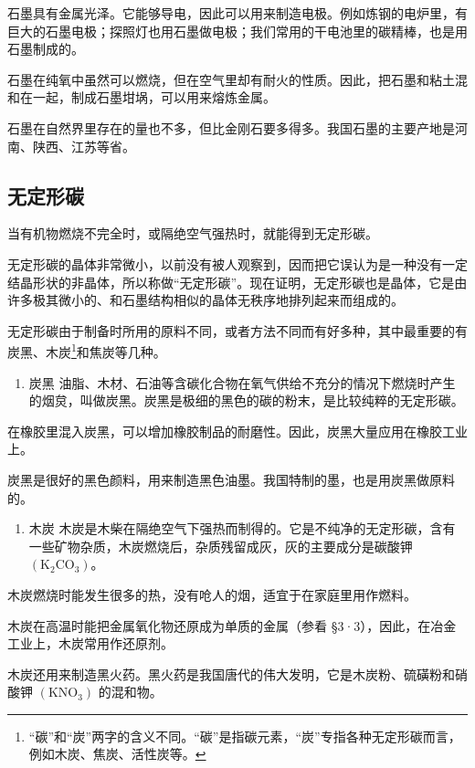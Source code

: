 石墨具有金属光泽。它能够导电，因此可以用来制造电极。例如炼钢的电炉里，有巨大的石墨电极；探照灯也用石墨做电极；我们常用的干电池里的碳精棒，也是用石墨制成的。

石墨在纯氧中虽然可以燃烧，但在空气里却有耐火的性质。因此，把石墨和粘土混和在一起，制成石墨坩埚，可以用来熔炼金属。

石墨在自然界里存在的量也不多，但比金刚石要多得多。我国石墨的主要产地是河南、陕西、江苏等省。

\subsection{无定形碳}

当有机物燃烧不完全时，或隔绝空气强热时，就能得到无定形碳。

无定形碳的晶体非常微小，以前没有被人观察到，因而把它误认为是一种没有一定结晶形状的非晶体，所以称做``无定形碳''。现在证明，无定形碳也是晶体，它是由许多极其微小的、和石墨结构相似的晶体无秩序地排列起来而组成的。

无定形碳由于制备时所用的原料不同，或者方法不同而有好多种，其中最重要的有炭黑、木炭\footnote{``碳''和``炭''两字的含义不同。``碳''是指碳元素，``炭''专指各种无定形碳而言，例如木炭、焦炭、活性炭等。}和焦炭等几种。

\begin{enumerate}
\item
  炭黑
  油脂、木材、石油等含碳化合物在氧气供给不充分的情况下燃烧时产生的烟炱，叫做炭黑。炭黑是极细的黑色的碳的粉末，是比较纯粹的无定形碳。
\end{enumerate}

在橡胶里混入炭黑，可以增加橡胶制品的耐磨性。因此，炭黑大量应用在橡胶工业上。

炭黑是很好的黑色颜料，用来制造黑色油墨。我国特制的墨，也是用炭黑做原料的。

\begin{enumerate}[start=2]
\item
  木炭
  木炭是木柴在隔绝空气下强热而制得的。它是不纯净的无定形碳，含有一些矿物杂质，木炭燃烧后，杂质残留成灰，灰的主要成分是碳酸钾
  \(\left(\mathrm{K}_{2}\mathrm{CO}_{3}\right)\)。
\end{enumerate}

木炭燃烧时能发生很多的热，没有呛人的烟，适宜于在家庭里用作燃料。

木炭在高温时能把金属氧化物还原成为单质的金属（参看
§3·3），因此，在冶金工业上，木炭常用作还原剂。

木炭还用来制造黑火药。黑火药是我国唐代的伟大发明，它是木炭粉、硫磺粉和硝酸钾
\(\left(\mathrm{KNO}_{3}\right)\) 的混和物。

